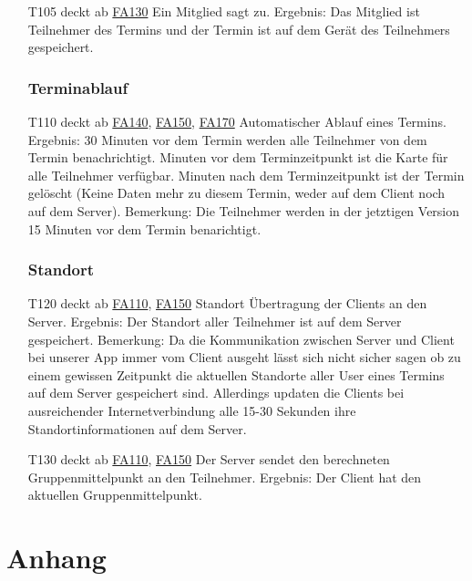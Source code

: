 \documentclass{scrartcl}
\begin{document}
\begin{itemize}
	\item[T105] deckt ab \hyperlink{FA130}{FA130}  \newline
	Ein Mitglied sagt zu.  \newline
	Ergebnis: Das Mitglied ist Teilnehmer des Termins und der Termin ist auf dem Gerät des Teilnehmers gespeichert.
	
	\subsubsection{Terminablauf}
	
	\item[T110] deckt ab \hyperlink{FA140}{FA140}, \hyperlink{FA150}{FA150}, \hyperlink{FA170}{FA170} \newline
	Automatischer Ablauf eines Termins. \newline
	Ergebnis: 30 Minuten vor dem Termin werden alle Teilnehmer von dem Termin benachrichtigt.   Minuten vor dem Terminzeitpunkt ist die Karte für alle Teilnehmer verfügbar.   Minuten nach dem Terminzeitpunkt ist der Termin gelöscht (Keine Daten mehr zu diesem Termin, weder auf dem Client noch auf dem Server).
	Bemerkung: Die Teilnehmer werden in der jetztigen Version 15 Minuten vor dem Termin benarichtigt. 
	
	\subsubsection{Standort}
	\item[T120] deckt ab \hyperlink{FA110}{FA110}, \hyperlink{FA150}{FA150} \newline
	Standort Übertragung der Clients an den Server.  \newline
	Ergebnis: Der Standort aller Teilnehmer ist auf dem Server gespeichert. \newline
	Bemerkung: Da die Kommunikation zwischen Server und Client bei unserer App immer vom Client ausgeht lässt sich nicht sicher sagen ob zu einem gewissen Zeitpunkt die aktuellen Standorte aller User eines Termins auf dem Server gespeichert sind. Allerdings updaten die Clients bei ausreichender Internetverbindung alle 15-30 Sekunden ihre Standortinformationen auf dem Server.
	
	\item[T130]  deckt ab \hyperlink{FA110}{FA110}, \hyperlink{FA150}{FA150} \newline
	Der Server sendet den berechneten Gruppenmittelpunkt an den Teilnehmer. \newline
	Ergebnis: Der Client hat den aktuellen Gruppenmittelpunkt.
	
\end{itemize}	

\newpage
\section{Anhang}
\end{document}
